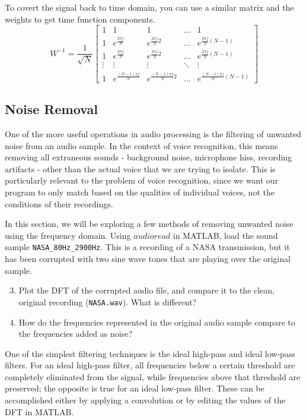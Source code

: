 \documentclass{tufte-handout}
\begin{document}
To covert the signal back to time domain, you can use a similar matrix and the weights to get time function components. 
\begin{equation}\label{eq:basis_fns}
    W^{-1}=\dfrac{1}{\sqrt{N}}
\begin{bmatrix}
    1 & 1 & 1 & \dots  & 1 \\
    1 & e^{\frac{2 \pi j}{N}} & e^{\frac{2 \pi j}{N}2} & \dots  & e^{\frac{2 \pi j}{N}(N-1)} \\
    1 & e^{\frac{3 \pi j}{N}} & e^{\frac{2 \pi j}{N}2} & \dots  & e^{\frac{2 \pi j}{N}(N-1)} \\
    \vdots & \vdots & \vdots & \ddots & \vdots \\
    1 & e^{\frac{(N-1) \pi j}{N}} & e^{\frac{(N-1) \pi j}{N}2} & \dots  & e^{\frac{(N-1) \pi j}{N}(N-1)}
\end{bmatrix}
\end{equation}

\subsection{Noise Removal}
One of the more useful operations in audio processing is the filtering of unwanted noise from an audio sample. In the context of voice recognition, this means removing all extraneous sounds - background noise, microphone hiss, recording artifacts - other than the actual voice that we are trying to isolate. This is particularly relevant to the problem of voice recognition, since we want our program to only match based on the qualities of individual voices, not the conditions of their recordings.

In this section, we will be exploring a few methods of removing unwanted noise using the frequency domain. Using $audioread$ in MATLAB, load the sound sample \verb|NASA_80Hz_2900Hz|. This is a recording of a NASA transmission, but it has been corrupted with two sine wave tones that are playing over the original sample.

\begin{enumerate}
	\setcounter{enumi}{2}
	\item Plot the DFT of the corrupted audio file, and compare it to the clean, original recording (\verb|NASA.wav|). What is different?
	\item How do the frequencies represented in the original audio sample compare to the frequencies added as noise?
\end{enumerate}

One of the simplest filtering techniques is the ideal high-pass and ideal low-pass filters. For an ideal high-pass filter, all frequencies below a certain threshold are completely eliminated from the signal, while frequencies above that threshold are preserved; the opposite is true for an ideal low-pass filter. These can be accomplished either by applying a convolution or by editing the values of the DFT in MATLAB.
\end{document}
